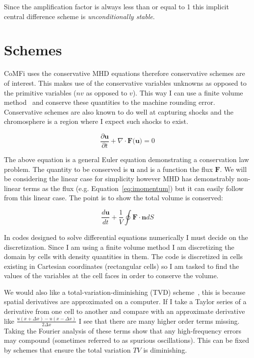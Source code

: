 \documentclass[12pt,upcase]{umlthesis}
\begin{document}
Since the amplification factor is always less than or equal to 1 this implicit central difference scheme is {\it unconditionally stable}.


\section{Schemes}\label{sec:schemes}

CoMFi uses the conservative MHD equations therefore conservative schemes are of interest. This makes use of the conservative variables unknowns as opposed to the primitive variables ($n v$ as opposed to $v$). This way I can use a finite volume method~\citep{leveque2002} and conserve these quantities to the machine rounding error. Conservative schemes are also known to do well at capturing shocks and the chromosphere is a region where I expect such shocks to exist.

\begin{equation}\label{eq:geneuler}
	\frac{\partial \textbf{u}}{\partial t} + \nabla \cdot \textbf{F(u)} = 0
\end{equation}

The above equation is a general Euler equation demonstrating a conservation law problem. The quantity to be conserved is $\textbf{u}$ and is a function the flux $\textbf{F}$. We will be considering the linear case for simplicity however MHD has demonstrably non-linear terms as the flux (e.g. Equation~\ref{eq:imomentum}) but it can easily follow from this linear case. The point is to show the total volume is conserved:

\begin{equation}\label{eq:geneulerint}
	\frac{d\textbf{u}}{dt} + \frac{1}{V} \oint \textbf{F} \cdot \textbf{n} dS
\end{equation}

In codes designed to solve differential equations numerically I must decide on the discretization. Since I am using a finite volume method I am discretizing the domain by cells with density quantities in them. The code is discretized in cells existing in Cartesian coordinates (rectangular cells) so I am tasked to find the values of the variables at the cell faces in order to conserve the volume.

We would also like a total-variation-diminishing (TVD) scheme~\citep{harten1997}, this is because spatial derivatives are approximated on a computer. If I take a Taylor series of a derivative from one cell to another and compare with an approximate derivative like $\frac{u(x+\Delta x)-u(x-\Delta x)}{2\Delta x}$ I see that there are many higher order terms missing. Taking the Fourier analysis of these terms show that any high-frequency errors may compound (sometimes referred to as spurious oscillations). This can be fixed by schemes that ensure the total variation $TV$ is diminishing.
\end{document}
